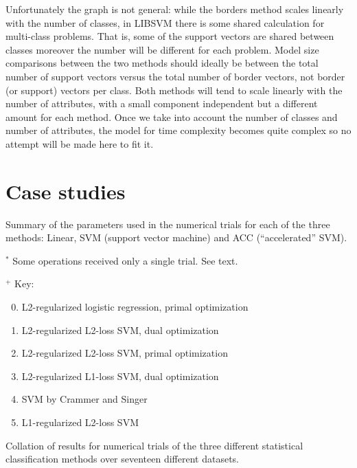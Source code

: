 Unfortunately the graph is not general: while the borders method scales linearly with
the number of classes, in LIBSVM there is some shared calculation for multi-class problems.
That is, some of the support vectors are shared between classes moreover the number will be different for each problem.
Model size comparisons between the two methods should ideally be between the total 
number of support vectors versus the total number of border vectors, not border (or support) vectors per class.
Both methods will tend to scale linearly with the number of attributes, with a small
component independent but a different amount for each method.
Once we take into account the number of classes and number of attributes, the
model for time complexity becomes quite complex so no attempt will be made here
to fit it.

\section{Case studies}

\label{results_section}

\begin{table}
	\caption{Summary of the parameters used in the numerical trials for each of the three methods: Linear, SVM (support vector machine) and ACC (``accelerated'' SVM).}
	\label{param}
	
	\vspace{1 ex}

	\raggedright 
	$^*$ Some operations received only a single trial. See text.

	$^+$ Key:\citep{Fan_etal2008}
	\begin{enumerate}
			\setcounter{enumi}{-1}
		\item L2-regularized logistic regression, primal optimization
		\item L2-regularized L2-loss SVM, dual optimization
		\item L2-regularized L2-loss SVM, primal optimization
		\item L2-regularized L1-loss SVM, dual optimization
		\item SVM by Crammer and Singer \citep{Crammer_Singer2002}
		\item L1-regularized L2-loss SVM
	\end{enumerate}
\end{table}

\begin{table}
	\caption{Collation of results for numerical trials of the three different statistical classification methods over seventeen different datasets.}
	\label{results}
	{\small
		
	}
\end{table}

